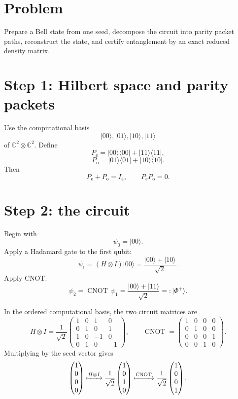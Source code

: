 \documentclass[11pt,oneside]{book}
\theoremstyle{definition}
\theoremstyle{remark}
\newcommand{\C}{\mathbb C}
\begin{document}
\section{Problem}
Prepare a Bell state from one seed, decompose the circuit into parity packet paths, reconstruct the state, and certify entanglement by an exact reduced density matrix.

\section{Step 1: Hilbert space and parity packets}
Use the computational basis
\[
|00\rangle,|01\rangle,|10\rangle,|11\rangle
\]
of $\C^2\otimes\C^2$. Define
\[
P_{\mathrm e}=|00\rangle\langle00|+|11\rangle\langle11|,
\]
\[
P_{\mathrm o}=|01\rangle\langle01|+|10\rangle\langle10|.
\]
Then
\[
P_{\mathrm e}+P_{\mathrm o}=I_4,
\qquad
P_{\mathrm e}P_{\mathrm o}=0.
\]

\section{Step 2: the circuit}
Begin with
\[
\psi_0=|00\rangle.
\]
Apply a Hadamard gate to the first qubit:
\[
\psi_1=(H\otimes I)|00\rangle
=\frac{|00\rangle+|10\rangle}{\sqrt2}.
\]
Apply CNOT:
\[
\psi_2=\operatorname{CNOT}\,\psi_1
=\frac{|00\rangle+|11\rangle}{\sqrt2}
=:|\Phi^+\rangle.
\]

In the ordered computational basis, the two circuit matrices are
\[
H\otimes I=\frac1{\sqrt2}
\begin{pmatrix}
1&0&1&0\\
0&1&0&1\\
1&0&-1&0\\
0&1&0&-1
\end{pmatrix},
\qquad
\operatorname{CNOT}=
\begin{pmatrix}
1&0&0&0\\
0&1&0&0\\
0&0&0&1\\
0&0&1&0
\end{pmatrix}.
\]
Multiplying by the seed vector gives
\[
\begin{pmatrix}1\\0\\0\\0\end{pmatrix}
\xmapsto{H\otimes I}
\frac1{\sqrt2}
\begin{pmatrix}1\\0\\1\\0\end{pmatrix}
\xmapsto{\operatorname{CNOT}}
\frac1{\sqrt2}
\begin{pmatrix}1\\0\\0\\1\end{pmatrix}.
\]
\end{document}
